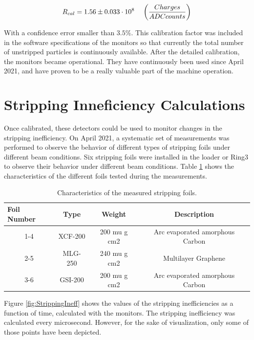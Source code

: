 \begin{equation}
    R_{cal} = 1.56 \pm 0.033 \cdot 10^8 \hspace{0.4cm} \left(\frac{Charges}{ADC counts}\right)
\end{equation}

With a confidence error smaller than $3.5\%$. This calibration factor was included in the software specifications of the \hzhm monitors so that currently the total number of unstripped particles is continuously available. After the detailed calibration, the monitors became operational. They have continuously been used since April 2021, and have proven to be a really valuable part of the machine operation. 

\section{Stripping Inneficiency Calculations}
\label{sec:StrippingIneefMeas}

Once calibrated, these detectors could be used to monitor changes in the stripping inefficiency. On April 2021, a systematic set of measurements was performed to observe the behavior of different types of stripping foils under different beam conditions. Six stripping foils were installed in the loader or Ring3 to observe their behavior under different beam conditions. Table \ref{tab:SfType} shows the characteristics of the different foils tested during the measurements. 

\begin{table}[h]
    \begin{tabular}{cccc}
    \hline
    \multicolumn{1}{l}{\textbf{Foil Number}} & \textbf{Type} & \textbf{Weight} & \textbf{Description}            \\ \hline
    1-4                                      & XCF-200       & 200 mu g cm2    & Arc evaporated amorphous Carbon \\
    2-5                                      & MLG-250       & 240 mu g cm2    & Multilayer Graphene             \\
    3-6                                      & GSI-200       & 200 mu g cm2    & Arc evaporated amorphous Carbon \\ \hline
    \end{tabular}
    \caption{Characteristics of the measured stripping foils. }
    \label{tab:SfType}
\end{table}

Figure \ref{fig:StrippingIneff} shows the values of the stripping inefficiencies as a function of time, calculated with the \hzhm monitors. The stripping inefficiency was calculated every microsecond. However, for the sake of visualization, only some of those points have been depicted. 

